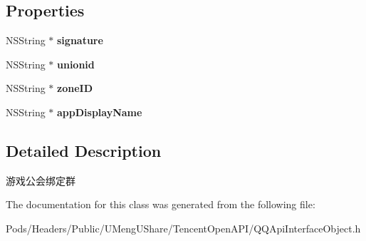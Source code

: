\subsection*{Properties}
\begin{DoxyCompactItemize}
\item 
\mbox{\label{interface_q_q_api_game_consortium_binding_group_object_a33b1ec21d505142aec02ad684c7eab52}} 
N\+S\+String $\ast$ {\bfseries signature}
\item 
\mbox{\label{interface_q_q_api_game_consortium_binding_group_object_a7ba7daf302faa6464e6a7ae2f3c78335}} 
N\+S\+String $\ast$ {\bfseries unionid}
\item 
\mbox{\label{interface_q_q_api_game_consortium_binding_group_object_a3a38dfee3ad8459f78a0eb675acb6b28}} 
N\+S\+String $\ast$ {\bfseries zone\+ID}
\item 
\mbox{\label{interface_q_q_api_game_consortium_binding_group_object_ad0ba9a2acfe7f253c03e37d69e3ee8e0}} 
N\+S\+String $\ast$ {\bfseries app\+Display\+Name}
\end{DoxyCompactItemize}


\subsection{Detailed Description}
游戏公会绑定群 

The documentation for this class was generated from the following file\+:\begin{DoxyCompactItemize}
\item 
Pods/\+Headers/\+Public/\+U\+Meng\+U\+Share/\+Tencent\+Open\+A\+P\+I/Q\+Q\+Api\+Interface\+Object.\+h\end{DoxyCompactItemize}
